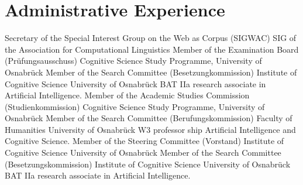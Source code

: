 \documentclass[11pt,a4paper]{moderncv}
\begin{document}
\section{Administrative Experience}
        {Secretary of the Special Interest Group on the Web as Corpus (SIGWAC)}
        {}
        {SIG of the Association for Computational Linguistics}
        {}
        {}
        {Member of the Examination Board (Pr\"{u}fungsausschuss)}
        {}
        {Cognitive Science Study Programme, University of Osnabr\"{u}ck}
        {}
        {}
        {Member of the Search Committee (Besetzungkommission)}
        {}
        {Institute of Cognitive Science}
        {University of Osnabr\"{u}ck}
        {BAT IIa research associate in Artificial Intelligence.}
        {Member of the Academic Studies Commission (Studienkommission)}
        {}
        {Cognitive Science Study Programme, University of Osnabr\"{u}ck}
        {}
        {}
        {Member of the Search Committee (Berufungskommission)}
        {}
        {Faculty of Humanities}
        {University of Osnabr\"{u}ck}
        {W3 professor ship Artificial Intelligence and Cognitive Science.}
        {Member of the Steering Committee (Vorstand)}
        {}
        {Institute of Cognitive Science}
        {University of Osnabr\"{u}ck}
        {}
        {Member of the Search Committee (Besetzungskommission)}
        {}
        {Institute of Cognitive Science}
        {University of Osnabr\"{u}ck}
        {BAT IIa research associate in Artificial Intelligence.}
\closesection{}


\end{document}
